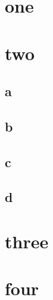 \chapter{one}
\chapter{two}
\section{a}
\section{b}
\section{c}
\section{d}
\chapter{three}
\chapter{four}